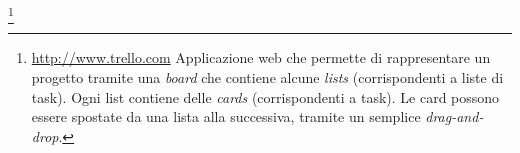 \footnote{\url{http://www.trello.com} Applicazione web che permette di rappresentare un progetto tramite una \emph{board} che contiene alcune
\emph{lists} (corrispondenti a liste di task). Ogni list contiene delle \emph{cards} (corrispondenti a task). Le card possono essere spostate da una
lista alla successiva, tramite un semplice \emph{drag-and-drop}.}
